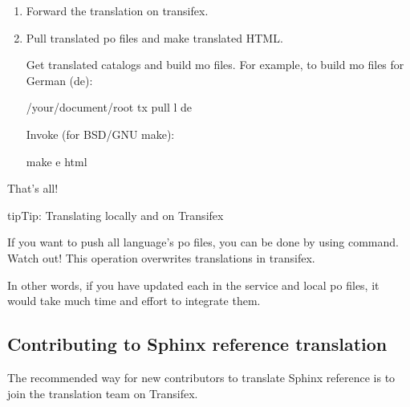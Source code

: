 \documentclass[letterpaper,10pt,english]{sphinxmanual}
\begin{document}
\begin{enumerate}
\item {} 
Forward the translation on transifex.

\item {} 
Pull translated po files and make translated HTML.

Get translated catalogs and build mo files. For example, to build mo files
for German (de):

\begin{sphinxVerbatim}[commandchars=\\\{\}]
  /your/document/root
 tx pull \PYGZhy{}l de
\end{sphinxVerbatim}

Invoke  (for BSD/GNU make):

\begin{sphinxVerbatim}[commandchars=\\\{\}]
 make \PYGZhy{}e  html
\end{sphinxVerbatim}

\end{enumerate}

That’s all!

\begin{sphinxadmonition}{tip}{Tip:}
Translating locally and on Transifex

If you want to push all language’s po files, you can be done by using
 command.  Watch out! This operation overwrites
translations in transifex.

In other words, if you have updated each in the service and local po files,
it would take much time and effort to integrate them.
\end{sphinxadmonition}


\subsection{Contributing to Sphinx reference translation}
\label{\detokenize{usage/advanced/intl:contributing-to-sphinx-reference-translation}}
The recommended way for new contributors to translate Sphinx reference is to
join the translation team on Transifex.
\end{document}
